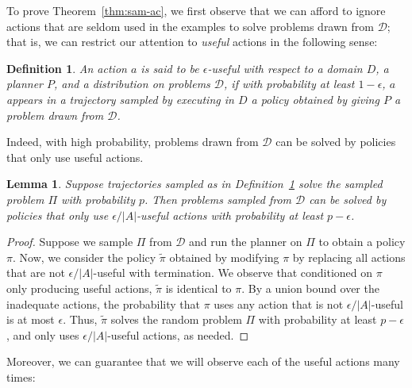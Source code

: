 \documentclass[letterpaper]{article} %
\newtheorem{definition}{Definition}
\newtheorem{lemma}{Lemma}
\begin{document}
To prove Theorem~\ref{thm:sam-ac}, we first observe that we can afford to ignore actions that are seldom used in the examples to solve problems drawn from $\mathcal{D}$; that is, we can restrict our attention to \emph{useful} actions in the following sense:

\begin{definition}\label{def:useful}
An action $a$ is said to be \emph{$\epsilon$-useful} with respect to a domain $D$, a planner $P$, and a distribution on problems $\mathcal{D}$, if with probability at least $1-\epsilon$, $a$ appears in a trajectory sampled by executing in $D$ a policy obtained by giving $P$ a problem drawn from $\mathcal{D}$. \end{definition}
\noindent
Indeed, with high probability, problems drawn from $\mathcal{D}$ can be solved by policies that only use useful actions.

\begin{lemma}\label{lem:only-useful}
Suppose trajectories sampled as in Definition~\ref{def:useful} solve the sampled problem $\Pi$ with probability $p$.
Then problems sampled from $\mathcal{D}$ can be solved by policies that only use $\epsilon/|A|$-useful actions with probability at least $p-\epsilon$.
\end{lemma}
\begin{proof}
Suppose we sample $\Pi$ from $\mathcal{D}$ and run the planner on $\Pi$ to obtain a policy $\pi$. 
Now, we consider the policy $\tilde{\pi}$ obtained by modifying $\pi$ by replacing all actions that are not $\epsilon/|A|$-useful with termination. We observe that conditioned on $\pi$ only producing useful actions, $\tilde{\pi}$ is identical to $\pi$. By a union bound over the inadequate actions, the probability that $\pi$ uses any action that is not $\epsilon/|A|$-useful is at most $\epsilon$.  Thus, $\tilde{\pi}$ solves the random problem $\Pi$ with probability at least $p-\epsilon$, and only uses $\epsilon/|A|$-useful actions, as needed.
\end{proof}

\noindent
Moreover, 
we can guarantee that we will observe each of the useful actions many times:
\end{document}
